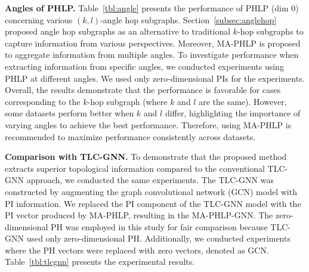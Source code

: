 \noindent\textbf{Angles of PHLP.} Table~\ref{tbl:angle} presents the performance of PHLP (dim $0$) concerning various \((k,l)\)-angle hop subgraphs.
Section~\ref{subsec:anglehop} proposed angle hop subgraphs as an alternative to traditional $k$-hop subgraphs to capture information from various perspectives. 
Moreover, MA-PHLP is proposed to aggregate information from multiple angles. 
To investigate performance when extracting information from specific angles, we conducted experiments using PHLP at different angles.
We used only zero-dimensional PIs for the experiments.
Overall, the results demonstrate that the performance is favorable for cases corresponding to the $k$-hop subgraph (where $k$ and $l$ are the same). 
However, some datasets perform better when $k$ and $l$ differ, highlighting the importance of varying angles to achieve the best performance. Therefore, using MA-PHLP is recommended to maximize performance consistently across datasets.


\noindent\textbf{Comparison with TLC-GNN.}
To demonstrate that the proposed method extracts superior topological information compared to the conventional TLC-GNN approach, we conducted the same experiments. 
The TLC-GNN was constructed by augmenting the graph convolutional network (GCN) model with PI information. 
We replaced the PI component of the TLC-GNN model with the PI vector produced by MA-PHLP, resulting in the MA-PHLP-GNN. 
The zero-dimensional PH was employed in this study for fair comparison because TLC-GNN used only zero-dimensional PH.
Additionally, we conducted experiments where the PH vectors were replaced with zero vectors, denoted as GCN. 
Table~\ref{tbl:tlcgnn} presents the experimental results.
\begin{table}[ht!]
\centering
\caption{comparison of AUC scores with TLC-GNN}
\label{tbl:tlcgnn}
\end{table}

